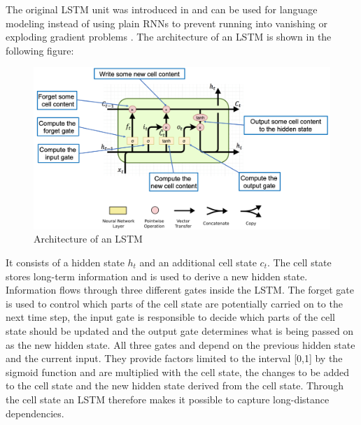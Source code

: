 
The original \ac{LSTM} unit was introduced in \cite{Hochreiter1997} and can be used for language modeling instead of using plain \acp{RNN} to prevent running into vanishing or exploding gradient problems \cite{Sundermeyer2012}. The architecture of an \ac{LSTM} is shown in the following figure:

\begin{figure}[ht]
	\centering
	\includegraphics[width=\linewidth]{figures/lstm_architecture.png}
	\caption{Architecture of an \ac{LSTM} \cite{Gertz2020}}
	\label{lstm_architecture}
\end{figure}

It consists of a hidden state $h_t$ and an additional cell state $c_t$. The cell state stores long-term information and is used to derive a new hidden state. Information flows through three different gates inside the \ac{LSTM}. The forget gate is used to control which parts of the cell state are potentially carried on to the next time step, the input gate is responsible to decide which parts of the cell state should be updated and the output gate determines what is being passed on as the new hidden state. All three gates and depend on the previous hidden state and the current input. They provide factors limited to the interval [0,1] by the sigmoid function and are multiplied with the cell state, the changes to be added to the cell state and the new hidden state derived from the cell state. Through the cell state an \ac{LSTM} therefore makes it possible to capture long-distance dependencies. \cite{Gertz2020}

